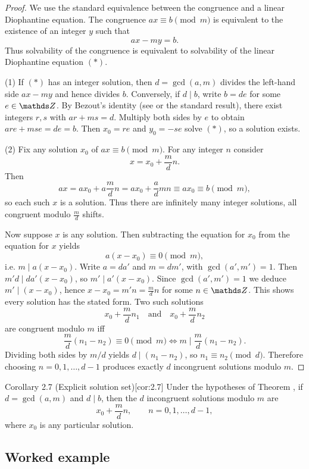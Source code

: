\documentclass[10pt]{article}
\theoremstyle{definition}
\theoremstyle{plain}
\numberwithin{equation}{section}
\begin{document}
\begin{proof}
We use the standard equivalence between the congruence and a linear Diophantine equation.
The congruence $ax\equiv b\pmod{m}$ is equivalent to the existence of an integer $y$
such that
\[
ax - my = b. \tag{*}
\]
Thus solvability of the congruence is equivalent to solvability of the linear Diophantine
equation $(*)$.

(1) If $(*)$ has an integer solution, then $d=\gcd(a,m)$ divides the left-hand side
$a x - my$ and hence divides $b$. Conversely, if $d\mid b$, write $b=d e$ for some
$e\in\setZ$. By Bezout's identity (see  or the standard result),
there exist integers $r,s$ with $ar+ms=d$. Multiply both sides by $e$ to obtain
$ar e + ms e = de = b$. Then $x_0 = re$ and $y_0 = -se$ solve $(*)$, so a solution exists.

(2) Fix any solution $x_0$ of $ax\equiv b\pmod{m}$. For any integer $n$ consider
\[
x = x_0 + \frac{m}{d}n.
\]
Then
\[
a x = a x_0 + a\frac{m}{d}n = a x_0 + \frac{a}{d}mn \equiv a x_0 \equiv b \pmod{m},
\]
so each such $x$ is a solution. Thus there are infinitely many integer solutions, all
congruent modulo $\frac{m}{d}$ shifts.

Now suppose $x$ is any solution. Then subtracting the equation for $x_0$ from the equation
for $x$ yields
\[
a(x-x_0) \equiv 0\pmod{m},
\]
i.e. $m\mid a(x-x_0)$. Write $a=d a'$ and $m=d m'$, with $\gcd(a',m')=1$. Then
$m'd \mid d a'(x-x_0)$, so $m'\mid a'(x-x_0)$. Since $\gcd(a',m')=1$ we deduce $m'\mid (x-x_0)$,
hence $x-x_0 = m' n = \frac{m}{d} n$ for some $n\in\setZ$. This shows every solution
has the stated form. Two such solutions
\[
x_0 + \frac{m}{d}n_1 \quad\text{and}\quad x_0+\frac{m}{d}n_2
\]
are congruent modulo $m$ iff
\[
\frac{m}{d}(n_1-n_2)\equiv 0\pmod{m} \iff m\mid \frac{m}{d}(n_1-n_2).
\]
Dividing both sides by $m/d$ yields $d\mid (n_1-n_2)$, so $n_1\equiv n_2\pmod{d}$. Therefore
choosing $n=0,1,\dots,d-1$ produces exactly $d$ incongruent solutions modulo $m$.
\end{proof}

\begin{define}{Corollary 2.7 (Explicit solution set)}[cor:2.7]
Under the hypotheses of Theorem , if $d=\gcd(a,m)$ and $d\mid b$, then
the $d$ incongruent solutions modulo $m$ are
\[
x_0 + \frac{m}{d}n,\qquad n=0,1,\dots,d-1,
\]
where $x_0$ is any particular solution.
\end{define}

\subsection*{Worked example}
\end{document}

